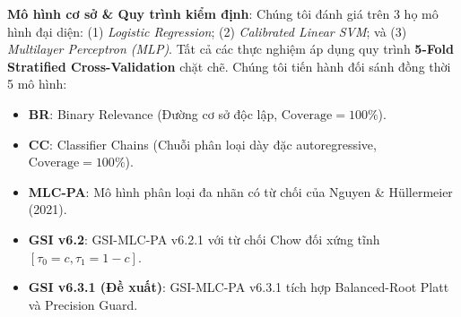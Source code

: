 \documentclass[10pt,a4paper,twoside]{article}
\begin{document}
\begin{table}[H]
\centering
\caption{Đặc trưng thống kê 10 tập dữ liệu thực nghiệm trong hệ thống GSI-MLC-PA.}
\label{tab:datasets}
\end{table}

\noindent\textbf{Mô hình cơ sở \& Quy trình kiểm định}: Chúng tôi đánh giá trên 3 họ mô hình đại diện: (1) \textit{Logistic Regression}; (2) \textit{Calibrated Linear SVM}; và (3) \textit{Multilayer Perceptron (MLP)}. Tất cả các thực nghiệm áp dụng quy trình \textbf{5-Fold Stratified Cross-Validation} chặt chẽ. Chúng tôi tiến hành đối sánh đồng thời 5 mô hình:
\begin{itemize}[leftmargin=*]
    \item \textbf{BR}: Binary Relevance (Đường cơ sở độc lập, $\text{Coverage} = 100\%$).
    \item \textbf{CC}: Classifier Chains (Chuỗi phân loại dày đặc autoregressive, $\text{Coverage} = 100\%$).
    \item \textbf{MLC-PA}: Mô hình phân loại đa nhãn có từ chối của Nguyen \& H{\"u}llermeier (2021).
    \item \textbf{GSI v6.2}: GSI-MLC-PA v6.2.1 với từ chối Chow đối xứng tĩnh $[\tau_0=c, \tau_1=1-c]$.
    \item \textbf{GSI v6.3.1 (Đề xuất)}: GSI-MLC-PA v6.3.1 tích hợp Balanced-Root Platt và Precision Guard.
\end{itemize}
\clearpage
\end{document}
